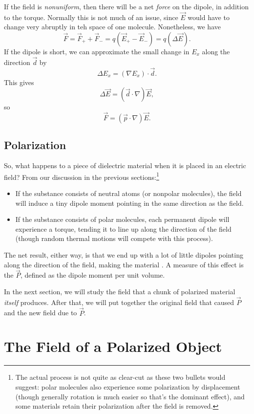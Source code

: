 If the field is \textit{nonuniform}, then there will be a net \textit{force} on the dipole, in addition to the torque. Normally this is not much of an issue, since $\vec{E}$ would have to change very abruptly in teh space of one molecule. Nonetheless, we have
\[\vec{F}=\vec{F}_++\vec{F}_-=q(\vec{E}_+-\vec{E}_-)=q(\Delta \vec{E}).\]
If the dipole is short, we can approximate the small change in $E_x$ along the direction $\vec{d}$ by
\[\Delta E_x=(\nabla E_x)\cdot \vec{d}.\]
This gives
\[\Delta\vec{E}=(\vec{d}\cdot \nabla)\vec{E},\]
so
\[\vec{F}=(\vec{p}\cdot \nabla)\vec{E}.\]

\subsection{Polarization}

So, what happens to a piece of dielectric material when it is placed in an electric field? From our discussion in the previous sections:\footnote{The actual process is not quite as clear-cut as these two bullets would suggest: polar molecules also experience some polarization by displacement (though generally rotation is much easier so that's the dominant effect), and some materials retain their polarization after the field is removed.}
\begin{itemize}
    \item If the substance consists of neutral atoms (or nonpolar molecules), the field will induce a tiny dipole moment pointing in the same direction as the field.
    \item If the substance consists of polar molecules, each permanent dipole will experience a torque, tending it to line up along the direction of the field (though random thermal motions will compete with this process).
\end{itemize}
The net result, either way, is that we end up with a lot of little dipoles pointing along the direction of the field, making the material . A measure of this effect is the  $\vec{P}$, defined as the dipole moment per unit volume.

In the next section, we will study the field that a chunk of polarized material \textit{itself} produces. After that, we will put together the original field that caused $\vec{P}$ and the new field due to $\vec{P}$.

\section{The Field of a Polarized Object}\label{fieldofpolarized}

